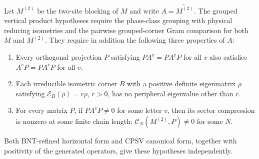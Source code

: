 \begin{definition}
    \label{def:mpdo_grouped_vertical_product_inputs}
    \leanok
    Let $M^{(2)}$ be the two-site blocking of $M$ and write
    $A=\widetilde{M^{(2)}}$. The grouped vertical product hypotheses require
    the phase-class grouping with physical reducing isometries and the
    pairwise grouped-corner Gram comparison for both $M$ and $M^{(2)}$.
    They require in addition the following three properties of $A$:
    \begin{enumerate}
        \item Every orthogonal projection $P$ satisfying
              $PA^v=PA^vP$ for all $v$ also satisfies $A^vP=PA^vP$ for all $v$.
        \item Each irreducible isometric corner $B$ with a positive definite
              eigenmatrix $\rho$ satisfying $\mathcal E_B(\rho)=r\rho$, $r>0$,
              has no peripheral eigenvalue other than $r$.
        \item For every matrix $P$, if $PA^vP\ne0$ for some letter $v$,
              then its sector compression is nonzero at some finite chain length:
              $\mathcal C_N(M^{(2)},P)\ne0$ for some $N$.
    \end{enumerate}
    Both BNT-refined horizontal form and CPSV canonical
    form, together with positivity of the generated operators, give these
    hypotheses independently.
\end{definition}

